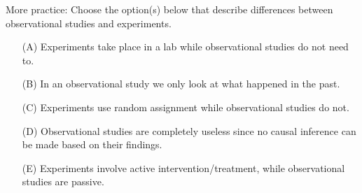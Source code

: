 \documentclass[11pt,letterpaper,twoside]{article}
\begin{document}
\vspace{20pt}

More practice: Choose the option(s) below that describe differences between observational studies and experiments.

\begin{enumerate}

\item[(A)] Experiments take place in a lab while observational studies do not need to.

\item[(B)] In an observational study we only look at what happened in the past.

\item[(C)] Experiments use random assignment while observational studies do not.

\item[(D)] Observational studies are completely useless since no causal inference can be made based on their findings.

\item[(E)] Experiments involve active intervention/treatment, while observational studies are passive. 

\end{enumerate}



\label{totalpag}
\end{document}
